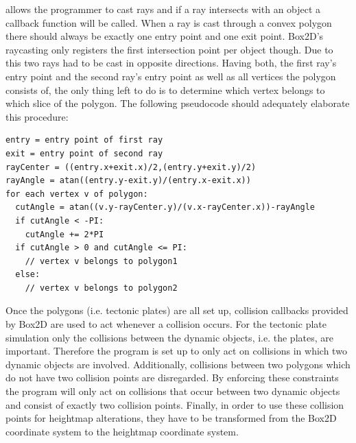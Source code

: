 \documentclass[11pt,a4paper,twoside,openright]{report}
\begin{document}
allows the programmer to cast rays and if a ray intersects with an object a callback function will be called. When a ray is cast through a convex polygon there should always be exactly one entry point and one exit point. Box2D's raycasting only registers the first intersection point per object though. Due to this two rays had to be cast in opposite directions. Having both, the first ray's entry point and the second ray's entry point as well as all vertices the polygon consists of, the only thing left to do is to determine which vertex belongs to which slice of the polygon. The following pseudocode should adequately elaborate this procedure:
\begin{lstlisting}[caption=Point in slice check pseudocode]
entry = entry point of first ray
exit = entry point of second ray
rayCenter = ((entry.x+exit.x)/2,(entry.y+exit.y)/2)
rayAngle = atan((entry.y-exit.y)/(entry.x-exit.x))
for each vertex v of polygon:
  cutAngle = atan((v.y-rayCenter.y)/(v.x-rayCenter.x))-rayAngle
  if cutAngle < -PI:
    cutAngle += 2*PI
  if cutAngle > 0 and cutAngle <= PI:
    // vertex v belongs to polygon1
  else:
    // vertex v belongs to polygon2
\end{lstlisting}
Once the polygons (i.e. tectonic plates) are all set up, collision callbacks provided by Box2D are used to act whenever a collision occurs. For the tectonic plate simulation only the collisions between the dynamic objects, i.e. the plates, are important. Therefore the program is set up to only act on collisions in which two dynamic objects are involved. Additionally, collisions between two polygons which do not have two collision points are disregarded. By enforcing these constraints the program will only act on collisions that occur between two dynamic objects and consist of exactly two collision points. Finally, in order to use these collision points for heightmap alterations, they have to be transformed from the Box2D coordinate system to the heightmap coordinate system.
\end{document}
